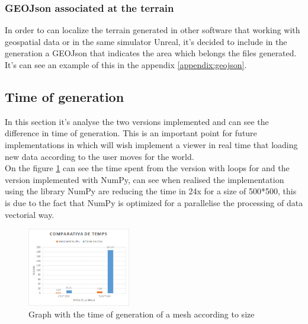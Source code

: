 \documentclass[10pt,a4paper,twocolumn,twoside]{article}
\begin{document}
\subsubsection{GEOJson associated at the terrain}

In order to can localize the terrain generated in other software that working with geospatial data or in the same simulator Unreal, it's decided to include in the generation a GEOJson that indicates the area which belongs the files generated. It's can see an example of this in the appendix \ref{appendix:geojson}.

\subsection{Time of generation}
In this section it's analyse the two versions implemented and can see the difference in time of generation. This is an important point for future implementations in which will wish implement a viewer in real time that loading new data according to the user moves for the world.
\\
On the figure \ref{fig-meshtime} can see the time spent from the version with loops for and the version implemented with NumPy, can see when realised the implementation using the library NumPy are reducing the time in 24x for a size of 500*500, this is due to the fact that NumPy is optimized for a parallelise the processing of data vectorial way.

\begin{figure}[!h]
\centering
  	\includegraphics[width=0.4\textwidth]{meshtime}
	\caption{Graph with the time of generation of a mesh according to size}
	\label{fig-meshtime}
\end{figure}
\end{document}
